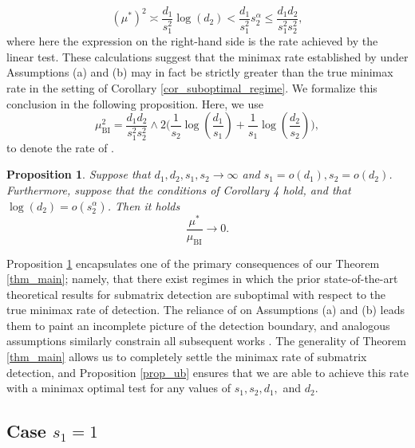\documentclass{article}
\newtheorem{proposition}{Proposition}
\theoremstyle{remark}
\begin{document}
    \begin{equation}
        (\mu^*)^2 \asymp \frac{d_1}{s_1^2}\log(d_2) < \frac{d_1}{s_1^2}s_2^{\alpha} \leq \frac{d_1d_2}{s_1^2s_2^2},
    \end{equation}
    where here the expression on the right-hand side is the rate achieved by the linear test. These calculations suggest that the minimax rate established by \citet{butucea2013detection} under Assumptions (a) and (b) may in fact be strictly greater than the true minimax rate in the setting of Corollary \ref{cor_suboptimal_regime}. We formalize this conclusion in the following proposition. Here, we use  
\begin{equation}
    \mu^2_{\text{BI}} =  \frac{d_1d_2}{s_1^2s_2^2} \land 2 \Bigg(\frac{1}{s_2}\log\left(\frac{d_1}{s_1}\right) + \frac{1}{s_1}\log\left(\frac{d_2}{s_2}\right)\Bigg),
\end{equation}
to denote the rate of \citet{butucea2013detection}.

    \begin{proposition}\label{prop_suboptimal}
        Suppose that $d_1, d_2, s_1, s_2 \rightarrow \infty$ and $s_1 = o(d_1), s_2 = o(d_2)$. Furthermore, suppose that the conditions of Corollary 4 hold, and that $\log(d_2) = o(s_2^{\alpha})$. Then it holds
        \[\frac{\mu^*}{\mu_{\text{BI}}} \rightarrow 0.\]
    \end{proposition}
    Proposition \ref{prop_suboptimal} encapsulates one of the primary consequences of our Theorem \ref{thm_main}; namely, that there exist regimes in which the prior state-of-the-art theoretical results for submatrix detection are suboptimal with respect to the true minimax rate of detection. The reliance of \citet{butucea2013detection} on Assumptions (a) and (b) leads them to paint an incomplete picture of the detection boundary, and analogous assumptions similarly constrain all subsequent works \citep{arias2014community,verzelen2015community,ma2015computational, luo2022tensor, dadon2024detection, oren2026inhomogeneous}. The generality of Theorem \ref{thm_main} allows us to completely settle the minimax rate of submatrix detection, and Proposition \ref{prop_ub} ensures that we are able to achieve this rate with a minimax optimal test for any values of $s_1, s_2, d_1,$ and $d_2$.
\subsection{Case $s_1 = 1$}\label{subsubsec_s1=1}
\end{document}
